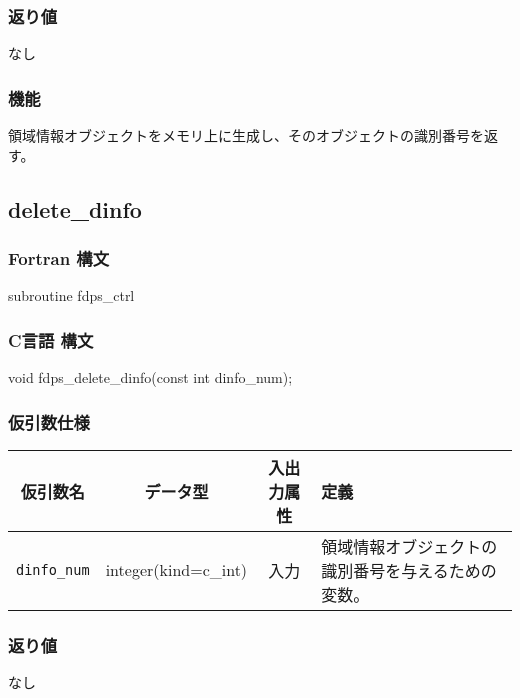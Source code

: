 \subsubsection*{返り値}
なし

\subsubsection*{機能}
領域情報オブジェクトをメモリ上に生成し、そのオブジェクトの識別番号を返す。
\clearpage

\subsection{delete\_dinfo}
\subsubsection*{Fortran 構文}
\begin{screen}
\begin{spverbatim}
subroutine fdps_ctrl%
\end{spverbatim}
\end{screen}

\subsubsection*{C言語 構文}
\begin{screen}
\begin{spverbatim}
void fdps_delete_dinfo(const int dinfo_num);
\end{spverbatim}
\end{screen}

\subsubsection*{仮引数仕様}
\begin{table}[h]
\begin{tabularx}{\linewidth}{cccX}
\toprule
\rowcolor{Snow2}
仮引数名 & データ型 & 入出力属性 & 定義 \\
\midrule
\texttt{dinfo\_num} & integer(kind=c\_int) & 入力 & 領域情報オブジェクトの識別番号を与えるための変数。\\
\bottomrule
\end{tabularx}
\end{table}

\subsubsection*{返り値}
なし

